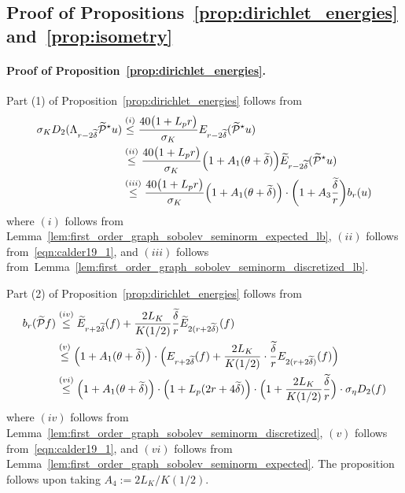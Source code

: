 \documentclass{article}
\newcommand{\1}{\mathbf{1}}
\newcommand{\mc}[1]{\mathcal{#1}}
\newcommand{\wt}[1]{\widetilde{#1}}
\theoremstyle{alden}
\theoremstyle{aldenthm}
\theoremstyle{definition}
\theoremstyle{remark}
\begin{document}
\subsection{Proof of Propositions~\ref{prop:dirichlet_energies} and~\ref{prop:isometry}}
\label{subsec:proof_of_prop_dirichlet_energies_and_isometry}

\paragraph{Proof of Proposition~\ref{prop:dirichlet_energies}.}
Part (1) of Proposition~\ref{prop:dirichlet_energies} follows from
\begin{align*}
\sigma_K D_2(\Lambda_{r - 2\wt{\delta}} \wt{\mc{P}}^{\star}u) & \overset{(i)}{\leq} \frac{40 \bigl(1 + L_p r\bigr)}{\sigma_K} E_{r - 2\wt{\delta}}(\wt{\mc{P}}^{\star}u) \\
& \overset{(ii)}{\leq} \frac{40 \bigl(1 + L_p r\bigr)}{\sigma_K} \Bigl(1 + A_1(\theta + \wt{\delta})\Bigr) \wt{E}_{r - 2\wt{\delta}}(\wt{\mc{P}}^{\star}u) \\
& \overset{(iii)}{\leq} \frac{40 \bigl(1 + L_p r\bigr)}{\sigma_K} \Bigl(1 + A_1(\theta + \wt{\delta})\Bigr) \cdot \biggl(1 + A_3\frac{\wt{\delta}}{r}\biggr) b_r(u)
\end{align*}
where $(i)$ follows from Lemma~\ref{lem:first_order_graph_sobolev_seminorm_expected_lb}, $(ii)$ follows from~\eqref{eqn:calder19_1}, and $(iii)$ follows from~Lemma~\ref{lem:first_order_graph_sobolev_seminorm_discretized_lb}.

Part (2) of Proposition~\ref{prop:dirichlet_energies} follows from
\begin{align*}
b_r(\wt{\mc{P}}f) & \overset{(iv)}{\leq} \wt{E}_{r + 2\wt{\delta}}(f) + \frac{2L_K}{K(1/2)}\frac{\wt{\delta}}{r}\wt{E}_{2(r + 2\wt{\delta})}(f)\\
& \overset{(v)}{\leq} \Bigl(1 + A_1(\theta + \wt{\delta})\Bigr) \cdot \Bigl({E}_{r + 2\wt{\delta}}(f) + \frac{2L_K}{K(1/2)}\cdot\frac{\wt{\delta}}{r}{E}_{2(r + 2\wt{\delta})}(f)\Bigr) \\
& \overset{(vi)}{\leq} \Bigl(1 + A_1(\theta + \wt{\delta})\Bigr) \cdot \Bigl(1 + L_p(2r + 4\wt{\delta})\Bigr) \cdot \Bigl(1 + \frac{2L_K}{K(1/2)}\frac{\wt{\delta}}{r}\Bigr) \cdot \sigma_{\eta} D_2(f)
\end{align*}
where $(iv)$ follows from Lemma~\ref{lem:first_order_graph_sobolev_seminorm_discretized}, $(v)$ follows from~\eqref{eqn:calder19_1}, and $(vi)$ follows from Lemma~\ref{lem:first_order_graph_sobolev_seminorm_expected}. The proposition follows upon taking $A_4 := 2L_K/K(1/2)$. 
\end{document}

